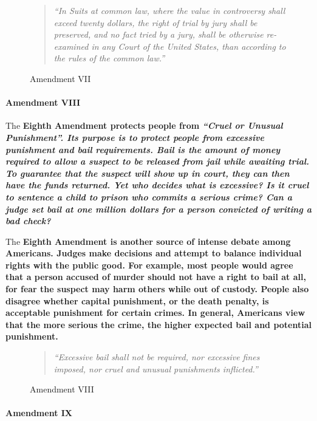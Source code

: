 \begin{figure}[h]
    \begin{quote}
        \it{“In Suits at common law, where the value in controversy shall exceed twenty dollars, the right of trial by jury shall be preserved, and no fact tried by a jury, shall be otherwise re-examined in any Court of the United States, than according to the rules of the common law.”}
    \end{quote}
    \caption{Amendment VII}
\end{figure}

\paragraph{Amendment VIII}

The \bf{Eighth Amendment} protects people from \it{“Cruel or Unusual Punishment”}. Its purpose is to protect people from excessive punishment and bail requirements. Bail is the amount of money required to allow a suspect to be released from jail while awaiting trial. To guarantee that the suspect will show up in court, they can then have the funds returned. Yet who decides what is excessive? Is it cruel to sentence a child to prison who commits a serious crime? Can a judge set bail at one million dollars for a person convicted of writing a bad check?

The \bf{Eighth Amendment} is another source of intense debate among Americans. Judges make decisions and attempt to balance individual rights with the public good. For example, most people would agree that a person accused of murder should not have a right to bail at all, for fear the suspect may harm others while out of custody. People also disagree whether capital punishment, or the death penalty, is acceptable punishment for certain crimes. In general, Americans view that the more serious the crime, the higher expected bail and potential punishment.

\begin{figure}[h]
    \begin{quote}
        \it{“Excessive bail shall not be required, nor excessive fines imposed, nor cruel and unusual punishments inflicted.”}
    \end{quote}
    \caption{Amendment VIII}
\end{figure}

\paragraph{Amendment IX}

